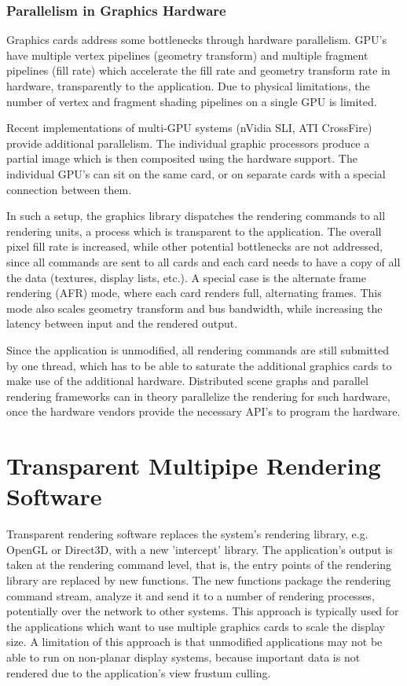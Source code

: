 \documentclass[10pt,a4paper]{scrartcl}
\begin{document}
\subsubsection{Parallelism in Graphics Hardware}
Graphics cards address some bottlenecks through hardware
parallelism. GPU's have multiple vertex pipelines (geometry
transform) and multiple fragment pipelines (fill rate) which
accelerate the fill rate and geometry transform rate in hardware,
transparently to the application. Due to physical limitations, the
number of vertex and fragment shading pipelines on a single GPU is limited.

Recent implementations of multi-GPU systems (nVidia SLI, ATI CrossFire)
provide additional parallelism. The individual graphic processors
produce a partial image which is then composited using the hardware
support. The individual GPU's can sit on the same card, or on separate
cards with a special connection between them.

In such a setup, the graphics library dispatches the rendering commands to all
rendering units, a process which is transparent to the application. The overall
pixel fill rate is increased, while other potential bottlenecks are not
addressed, since all commands are sent to all cards and each card needs to
have a copy of all the data (textures, display lists, etc.). A special
case is the alternate frame rendering (AFR) mode,
where each card renders full, alternating frames. This mode also scales
geometry transform and bus bandwidth, while increasing the latency
between input and the rendered output.

Since the application is unmodified, all rendering commands are still
submitted by one thread, which has to be able to saturate the additional
graphics cards to make use of the additional hardware. Distributed scene
graphs and parallel rendering frameworks can in theory parallelize the
rendering for such hardware, once the hardware vendors provide the
necessary API's to program the hardware.

\section{Transparent Multipipe Rendering Software}
Transparent rendering software replaces the system's rendering library,
e.g. OpenGL or Direct3D, with a new 'intercept' library. The
application's output is taken at the rendering command level, that is,
the entry points of the rendering library are replaced by new
functions. The new functions package the rendering command stream,
analyze it and send it to a number of rendering processes, potentially
over the network to other systems. This approach is typically used for
the applications which want to use multiple graphics cards to scale the
display size. A limitation of this approach is that unmodified
applications may not be able to run on non-planar display systems,
because important data is not rendered due to the application's view
frustum culling.
\end{document}
